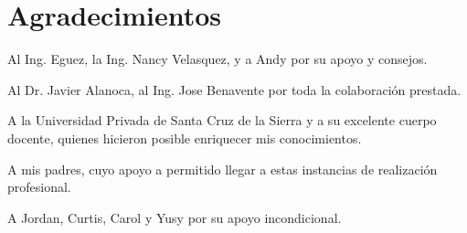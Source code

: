 \chapter*{Agradecimientos}
\thispagestyle{empty}

\begin{center}
        \vspace{0.3cm}

Al Ing. Eguez, la Ing. Nancy Velasquez, y a Andy por su apoyo y consejos.
        \vspace{0.7cm}

Al Dr. Javier Alanoca, al Ing. Jose Benavente por toda la colaboración prestada.
        \vspace{0.7cm}

A la Universidad Privada de Santa Cruz de la Sierra y a su excelente cuerpo
docente, quienes hicieron posible enriquecer mis conocimientos.
        \vspace{0.7cm}

A mis padres, cuyo apoyo a permitido llegar a estas instancias de realización
profesional.
        \vspace{0.7cm}

A Jordan, Curtis, Carol y Yusy por su apoyo incondicional.

\end{center}

\clearpage